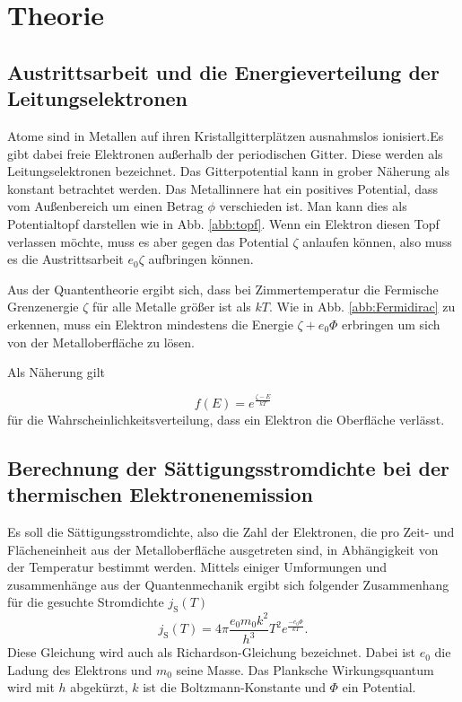 \section{Theorie}
\label{sec:Theorie}

\subsection{Austrittsarbeit und die Energieverteilung der Leitungselektronen}

Atome sind in Metallen auf ihren Kristallgitterplätzen ausnahmslos ionisiert.Es gibt dabei freie Elektronen außerhalb der periodischen Gitter. Diese werden als Leitungselektronen bezeichnet. Das Gitterpotential kann in grober Näherung als konstant betrachtet werden. Das Metallinnere hat ein positives Potential, dass vom Außenbereich um einen Betrag $\phi$ verschieden ist. Man kann dies als Potentialtopf darstellen wie in Abb. \ref{abb:topf}. Wenn ein Elektron diesen Topf verlassen möchte, muss es aber gegen das Potential $\zeta$ anlaufen können, also muss es die Austrittsarbeit $e_0 \zeta$ aufbringen können. 

Aus der Quantentheorie ergibt sich, dass bei Zimmertemperatur die Fermische Grenzenergie $\zeta$ für alle Metalle größer ist als $k T$. Wie in Abb. \ref{abb:Fermidirac} zu erkennen, muss ein Elektron mindestens die Energie $\zeta + e_0 \Phi$ erbringen um sich von der Metalloberfläche zu lösen. 

Als Näherung gilt 

\begin{equation}
    f(E) = e^{\frac{\zeta - E}{k T}}
    \label{eqn:fermidirac}
\end{equation}
für die Wahrscheinlichkeitsverteilung, dass ein Elektron die Oberfläche  verlässt. 

\subsection{Berechnung der Sättigungsstromdichte bei der thermischen Elektronenemission}

Es soll die Sättigungsstromdichte, also die Zahl der Elektronen, die pro Zeit- und Flächeneinheit aus der Metalloberfläche ausgetreten sind, in Abhängigkeit von der Temperatur bestimmt werden. Mittels einiger Umformungen und zusammenhänge aus der Quantenmechanik ergibt sich folgender Zusammenhang für die gesuchte Stromdichte $j_\text{S}(T)$ 
\begin{equation}
    j_\text{S}(T)= 4 \pi \frac{e_0 m_0 k^2}{h^3} T^2 e^{\frac{-e_0 \Phi}{k T}}.
    \label{eqn:richardson}
\end{equation}
Diese Gleichung wird auch als Richardson-Gleichung bezeichnet. 
Dabei ist $e_0$ die Ladung des Elektrons und $m_0$ seine Masse. Das Planksche Wirkungsquantum wird mit $h$ abgekürzt, $k$ ist die Boltzmann-Konstante und $\Phi$ ein Potential. %

